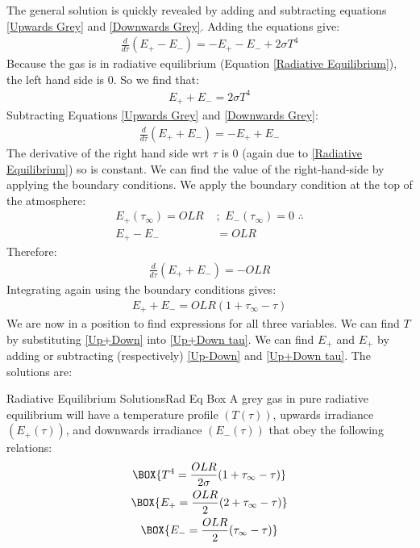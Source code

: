 The general solution is quickly revealed by adding and subtracting equations \ref{Upwards Grey} and \ref{Downwards Grey}. Adding the equations give:
\begin{align*}
    \frac{d}{d\tau}(E_+-E_-)=-E_+-E_-+2\sigma T^4
\end{align*}
Because the gas is in radiative equilibrium (Equation \ref{Radiative Equilibrium}), the left hand side is $0$. So we find that:
\begin{align}\label{Up+Down}
    E_++E_-=2\sigma T^4
\end{align}
Subtracting Equations \ref{Upwards Grey} and \ref{Downwards Grey}:
\begin{align*}
    \frac{d}{d\tau}(E_++E_-)=-E_++E_-
\end{align*}
The derivative of the right hand side wrt $\tau$ is $0$ (again due to \ref{Radiative Equilibrium}) so is constant. We can find the value of the right-hand-side by applying the boundary conditions. We apply the boundary condition at the top of the atmosphere:
\begin{align}
    E_+(\tau_\infty)=OLR \,\, &;\,\,  
    E_-(\tau_\infty)=0\,\, \therefore\nonumber\\
    E_+-E_-&=OLR\label{Up-Down}
\end{align}
Therefore:
\begin{align*}
    \frac{d}{d\tau}(E_++E_-)=-OLR
\end{align*}
Integrating again using the boundary conditions gives:
\begin{align}
    E_++E_-=OLR(1+\tau_\infty-\tau)\label{Up+Down tau}
\end{align}
We are now in a position to find expressions for all three variables. We can find $T$ by substituting \ref{Up+Down} into \ref{Up+Down tau}. We can find $E_+$ and $E_+$ by adding or subtracting (respectively) \ref{Up-Down} and \ref{Up+Down tau}. The solutions are:
\begin{fact}{Radiative Equilibrium Solutions}{Rad Eq Box}\label{Rad Eq Box}
    A grey gas in pure radiative equilibrium will have a temperature profile $(T(\tau))$, upwards irradiance $(E_+(\tau))$, and downwards irradiance $(E_-(\tau))$ that obey the following relations:
    \begin{gather}
        \label{Radiative Eq Temperature}
        \BOX{T^4=\frac{OLR}{2\sigma}(1+\tau_\infty-\tau)}\\
        \BOX{E_+=\frac{OLR}{2}(2+\tau_\infty-\tau)}\\
        \BOX{E_-=\frac{OLR}{2}(\tau_\infty-\tau)}
    \end{gather}
\end{fact}


